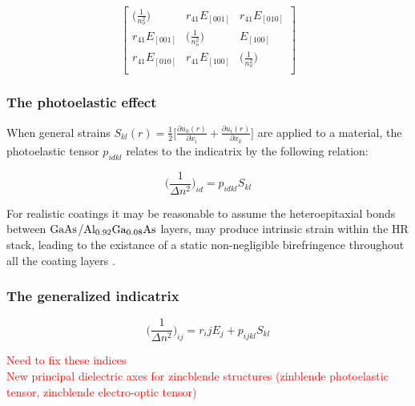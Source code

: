 \begin{equation}
 \left[ {\begin{array}{ccc}
   \big( \frac{1}{n_o ^2} \big)& r_{41}E_{[001]} & r_{41} E_{[010]}\\
   r_{41}E_{[001]} & \big( \frac{1}{n_o ^2} \big) &  E_{[100]}\\
   r_{41} E_{[010]} & r_{41} E_{[100]} & \big( \frac{1}{n_o ^2} \big)\\
  \end{array}} \right]
\end{equation}

\subsubsection{The photoelastic effect}

When general strains $S_{kl}(r) = \frac{1}{2} \bigg[ \frac{\partial u_k (r)}{\partial x_i} + \frac{\partial u_i (r)}{\partial x_k} \bigg]$ are applied to a material, the photoelastic tensor $p_{idkl}$ relates to the indicatrix by the following relation:

\begin{equation}
 \bigg( \frac{1}{\Delta n^2} \bigg)_{id} = p_{idkl} S_{kl}
\end{equation}

For realistic coatings it may be reasonable to assume the heteroepitaxial bonds between $\mathrm{GaAs}$/$\mathrm{Al_{0.92}Ga_{0.08}As}$ layers, may produce intrinsic strain within the HR stack, leading to the existance of a static non-negligible birefringence throughout all the coating layers \cite{garret_cole?}.

\subsubsection{The generalized indicatrix}

\begin{equation}
\bigg( \frac{1}{\Delta n^2} \bigg)_{ij} = r_ijE_j + p_{ijkl} S_{kl}
\end{equation}

\textcolor{red}{Need to fix these indices}
\\
\textcolor{red}{New principal dielectric axes for zincblende structures (zinblende photoelastic tensor, zincblende electro-optic tensor)}

